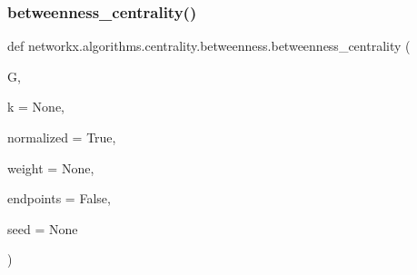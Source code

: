 \subsubsection{\texorpdfstring{betweenness\+\_\+centrality()}{betweenness\_centrality()}}
{\footnotesize\ttfamily def networkx.\+algorithms.\+centrality.\+betweenness.\+betweenness\+\_\+centrality (\begin{DoxyParamCaption}\item[{}]{G,  }\item[{}]{k = {\ttfamily None},  }\item[{}]{normalized = {\ttfamily True},  }\item[{}]{weight = {\ttfamily None},  }\item[{}]{endpoints = {\ttfamily False},  }\item[{}]{seed = {\ttfamily None} }\end{DoxyParamCaption})}

